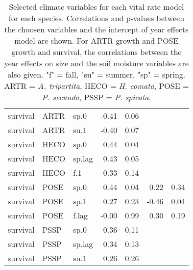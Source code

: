 \documentclass[11pt]{article}
\begin{document}
\begin{table}[ht]
\begin{tabular}{lllrrrr}
		survival & ARTR & sp.0 & -0.41 & 0.06 &  &  \\ 
		survival & ARTR & su.1 & -0.40 & 0.07 &  &  \\ 
		survival & HECO & sp.0 & 0.44 & 0.04 &  &  \\ 
		survival & HECO & sp.lag & 0.43 & 0.05 &  &  \\ 
		survival & HECO & f.1 & 0.33 & 0.14 &  &  \\ 
		survival & POSE & sp.0 & 0.44 & 0.04 & 0.22 & 0.34 \\ 
		survival & POSE & sp.1 & 0.27 & 0.23 & -0.46 & 0.04 \\ 
		survival & POSE & f.lag & -0.00 & 0.99 & 0.30 & 0.19 \\ 
		survival & PSSP & sp.0 & 0.36 & 0.11 &  &  \\ 
		survival & PSSP & sp.lag & 0.34 & 0.13 &  &  \\ 
		survival & PSSP & su.1 & 0.26 & 0.26 &  &  \\ 
		\hline
	\end{tabular}
	\caption{Selected climate variables for each vital rate model for each species. Correlations and p-values between the choosen variables and the intercept of year effects model are shown. For ARTR growth and POSE growth and survival, the correlations between the year effects on size and the soil moisture variables are also given. "f" = fall, "su" = summer, "sp" = spring. ARTR = \textit{A. tripartita}, HECO = \textit{H. comata}, POSE = \textit{P. secunda}, PSSP = \textit{P. spicata}.} 
	\label{table:strongCor}
\end{table}
\end{document}
